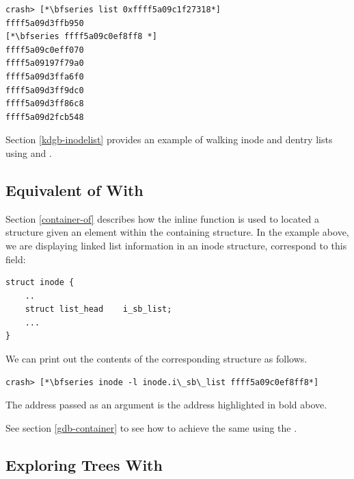 \begin{lstlisting}
crash> [*\bfseries list 0xffff5a09c1f27318*]
ffff5a09d3ffb950
[*\bfseries ffff5a09c0ef8ff8 *]
ffff5a09c0eff070 
ffff5a09197f79a0 
ffff5a09d3ffa6f0
ffff5a09d3ff9dc0
ffff5a09d3ff86c8
ffff5a09d2fcb548
\end{lstlisting}

\noindent
Section \ref{kdgb-inodelist} provides an example of walking inode and dentry lists using  and .


\subsection{Equivalent of  With }\label{crash-container}

Section \ref{container-of} describes how the  inline function is used to located a structure given an element within the containing structure. In the example above, we are displaying linked list information in an inode structure, correspond to this field:

\begin{lstlisting}
struct inode {
    ..
    struct list_head    i_sb_list;
    ...
}
\end{lstlisting}

\noindent
We can print out the contents of the corresponding  structure as follows.

\begin{lstlisting}
crash> [*\bfseries inode -l inode.i\_sb\_list ffff5a09c0ef8ff8*]
\end{lstlisting}

\noindent
The address passed as an argument is the address highlighted in bold above.

See section \ref{gdb-container} to see how to achieve the same using the .


\subsection{Exploring Trees With }


